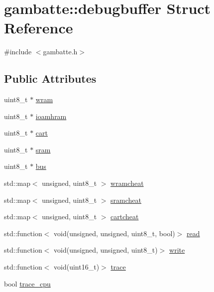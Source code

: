 \hypertarget{structgambatte_1_1debugbuffer}{}\section{gambatte\+:\+:debugbuffer Struct Reference}
\label{structgambatte_1_1debugbuffer}


{\ttfamily \#include $<$gambatte.\+h$>$}

\subsection*{Public Attributes}
\begin{DoxyCompactItemize}
\item 
uint8\+\_\+t $\ast$ \hyperlink{structgambatte_1_1debugbuffer_a7d1a27d05162751eefea5cbe85cc6748}{wram}
\item 
uint8\+\_\+t $\ast$ \hyperlink{structgambatte_1_1debugbuffer_a3b51b5020db1e332b0596f1e8b376f68}{ioamhram}
\item 
uint8\+\_\+t $\ast$ \hyperlink{structgambatte_1_1debugbuffer_acbd34e1d405e20746ab6085e7b097cfc}{cart}
\item 
uint8\+\_\+t $\ast$ \hyperlink{structgambatte_1_1debugbuffer_ad1fb9c5969023643db53c1a6b00baf3c}{sram}
\item 
uint8\+\_\+t $\ast$ \hyperlink{structgambatte_1_1debugbuffer_a11b2c1d00c09e48366852c4dfec16c82}{bus}
\item 
std\+::map$<$ unsigned, uint8\+\_\+t $>$ \hyperlink{structgambatte_1_1debugbuffer_a327804eae8f35be00e358fd7f83c7ea0}{wramcheat}
\item 
std\+::map$<$ unsigned, uint8\+\_\+t $>$ \hyperlink{structgambatte_1_1debugbuffer_aa655bfcaa74030bfc4684fcca839f0fd}{sramcheat}
\item 
std\+::map$<$ unsigned, uint8\+\_\+t $>$ \hyperlink{structgambatte_1_1debugbuffer_a71e6b95737006d0fbf3dbd7b00f2ff67}{cartcheat}
\item 
std\+::function$<$ void(unsigned, unsigned, uint8\+\_\+t, bool)$>$ \hyperlink{structgambatte_1_1debugbuffer_ae80856b21b4b6116b5d76d8429afdc3b}{read}
\item 
std\+::function$<$ void(unsigned, unsigned, uint8\+\_\+t)$>$ \hyperlink{structgambatte_1_1debugbuffer_a7f99fa9e2aaf67768956fa4f6dd6e8c4}{write}
\item 
std\+::function$<$ void(uint16\+\_\+t)$>$ \hyperlink{structgambatte_1_1debugbuffer_a9a587ada8cd1e40aa5eb3fd141a9e061}{trace}
\item 
bool \hyperlink{structgambatte_1_1debugbuffer_a9283e66b2b7e805d246544f3702bbddd}{trace\+\_\+cpu}
\end{DoxyCompactItemize}


